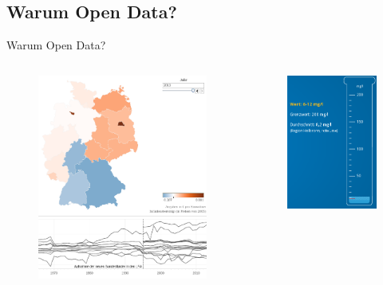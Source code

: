 \subsection{Warum Open Data?}
\begin{frame}[t]{Warum Open Data?}
 \begin{columns}
  \begin{figure}[h]
   \centering
   \includegraphics[scale=0.2]{section_open_data_politics.png}
  \end{figure}
  \begin{figure}[h]
   \centering
   \includegraphics[scale=0.2]{section_open_data_complexity.png}

\end{figure}
\end{columns}
\end{frame}
